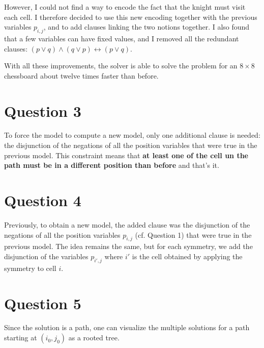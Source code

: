 \documentclass[a4paper, 11pt, oneside]{article}
\begin{document}
However, I could not find a way to encode the fact that the knight must visit each cell.
I therefore decided to use this new encoding together with the previous variables $p_{i,j}$,
and to add clauses linking the two notions together.
I also found that a few variables can have fixed values, and I removed
all the redundant clauses: $(p \lor q) \land (q \lor p) \leftrightarrow (p \lor q)$.

With all these improvements, the solver is able to solve the problem
for an $8 \times 8$ chessboard about twelve times faster than before.


\section{Question 3}

To force the model to compute a new model, only one additional clause is needed: the
disjunction of the negations of all the position variables that were true in the
previous model.
This constraint means that \textbf{at least one of the cell un the path must be in a
different position than before} and that's it.

\section{Question 4}

Previously, to obtain a new model, the added clause was the disjunction of the
negations of all the position variables $p_{i,j}$ (cf. Question 1) that were true
in the previous model. The idea remains the same, but for each symmetry, we add
the disjunction of the variables $p_{i', j}$ where $i'$ is the cell obtained by
applying the symmetry to cell $i$.

\section{Question 5}

Since the solution is a path, one can visualize the multiple solutions for a path
starting at $(i_0, j_0)$ as a rooted tree.
\end{document}
